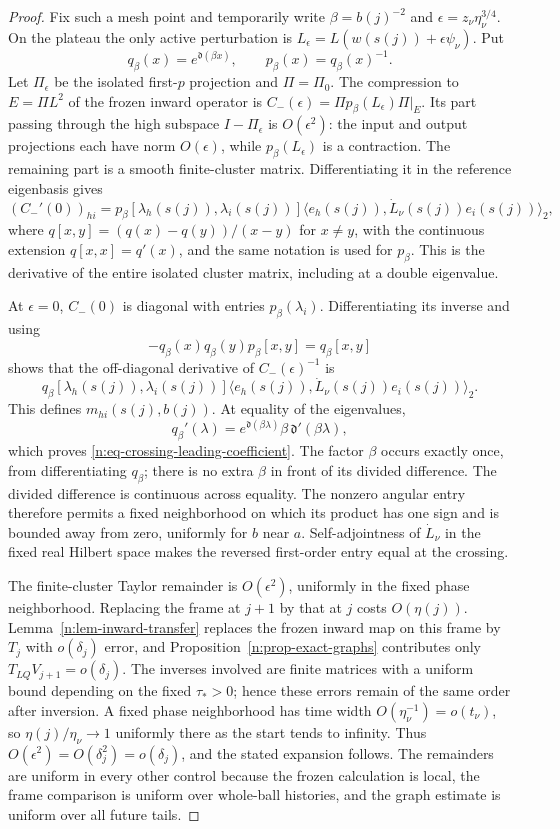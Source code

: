 \begin{proof}
Fix such a mesh point and temporarily write \(\beta=b(j)^{-2}\) and
\(\epsilon=z_\nu\eta_\nu^{3/4}\).  On the plateau the only active
perturbation is \(L_\epsilon=L(w(s(j))+\epsilon\psi_\nu)\).
Put
\[
 q_\beta(x)=e^{\mathfrak d(\beta x)},\qquad
 p_\beta(x)=q_\beta(x)^{-1}.
\]
Let \(\Pi_\epsilon\) be the isolated first-\(p\) projection and
\(\Pi=\Pi_0\).  The compression to \(E=\Pi L^2\) of the frozen inward
operator is \(C_-(\epsilon)=\Pi p_\beta(L_\epsilon)\Pi|_E\).
Its part passing through the high subspace \(I-\Pi_\epsilon\) is
\(O(\epsilon^2)\): the input and output projections each have norm
\(O(\epsilon)\), while \(p_\beta(L_\epsilon)\) is a contraction.
The remaining part is a smooth finite-cluster matrix.  Differentiating it
in the reference eigenbasis gives
\[
 (C_-'(0))_{hi}
 =p_\beta[\lambda_h(s(j)),\lambda_i(s(j))]
       \langle e_h(s(j)),\dot L_\nu(s(j))e_i(s(j))\rangle_2 ,
\]
where \(q[x,y]=(q(x)-q(y))/(x-y)\) for \(x\neq y\), with the continuous
extension \(q[x,x]=q'(x)\), and the same notation is used for \(p_\beta\).
This is the derivative of the entire isolated cluster matrix, including
at a double eigenvalue.

At \(\epsilon=0\), \(C_-(0)\) is diagonal with entries
\(p_\beta(\lambda_i)\).  Differentiating its inverse and using
\[
 -q_\beta(x)q_\beta(y)p_\beta[x,y]=q_\beta[x,y]
\]
shows that the off-diagonal derivative of \(C_-(\epsilon)^{-1}\) is
\[
 q_\beta[\lambda_h(s(j)),\lambda_i(s(j))]
       \langle e_h(s(j)),\dot L_\nu(s(j))e_i(s(j))\rangle_2 .
\]
This defines \(m_{hi}(s(j),b(j))\).  At equality of the eigenvalues,
\[
 q_\beta'(\lambda)
 =e^{\mathfrak d(\beta\lambda)}
       \beta\,\mathfrak d'(\beta\lambda),
\]
which proves \eqref{n:eq-crossing-leading-coefficient}.  The factor
\(\beta\) occurs exactly once, from differentiating \(q_\beta\); there is
no extra \(\beta\) in front of its divided difference.
The divided difference is continuous across equality.  The nonzero
angular entry therefore permits a fixed neighborhood on which its product
has one sign and is bounded away from zero, uniformly for \(b\) near \(a\).
Self-adjointness of \(\dot L_\nu\) in the fixed real Hilbert space makes
the reversed first-order entry equal at the crossing.

The finite-cluster Taylor remainder is \(O(\epsilon^2)\), uniformly in
the fixed phase neighborhood.  Replacing the frame at \(j+1\) by that at
\(j\) costs \(O(\eta(j))\).  Lemma~\ref{n:lem-inward-transfer} replaces the
frozen inward map on this frame by \(T_j\) with \(o(\delta_j)\) error, and
Proposition~\ref{n:prop-exact-graphs} contributes only
\(T_{LQ}V_{j+1}=o(\delta_j)\).  The inverses involved are finite matrices
with a uniform bound depending on the fixed \(\tau_*>0\); hence these
errors remain of the same order after inversion.  A fixed phase
neighborhood has time width \(O(\eta_\nu^{-1})=o(t_\nu)\), so
\(\eta(j)/\eta_\nu\to1\) uniformly there as the start tends to infinity.
Thus \(O(\epsilon^2)=O(\delta_j^2)=o(\delta_j)\), and the stated
expansion follows.  The remainders are uniform in every other control
because the frozen calculation is local, the frame comparison is uniform
over whole-ball histories, and the graph estimate is uniform over all
future tails.
\end{proof}
